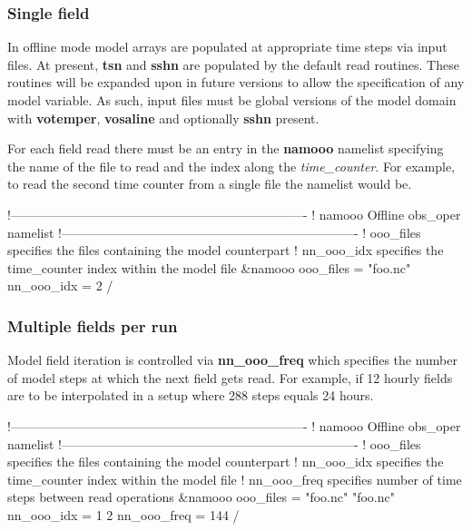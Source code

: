\documentclass[../tex_main/NEMO_manual]{subfiles}
\begin{document}
\subsubsection{Single field}

In offline mode model arrays are populated at appropriate time steps via input files.
At present, \textbf{tsn} and \textbf{sshn} are populated by the default read routines. 
These routines will be expanded upon in future versions to allow the specification of any model variable.
As such, input files must be global versions of the model domain with
\textbf{votemper}, \textbf{vosaline} and optionally \textbf{sshn} present.

For each field read there must be an entry in the \textbf{namooo} namelist specifying
the name of the file to read and the index along the \emph{time\_counter}.
For example, to read the second time counter from a single file the namelist would be.

\begin{forlines}
!----------------------------------------------------------------------
!       namooo Offline obs_oper namelist
!----------------------------------------------------------------------
!   ooo_files    specifies the files containing the model counterpart
!   nn_ooo_idx   specifies the time_counter index within the model file
&namooo
   ooo_files = "foo.nc"
   nn_ooo_idx = 2
/
\end{forlines}

\subsubsection{Multiple fields per run}

Model field iteration is controlled via \textbf{nn\_ooo\_freq} which
specifies the number of model steps at which the next field gets read.
For example, if 12 hourly fields are to be interpolated in a setup where 288 steps equals 24 hours.

\begin{forlines}
!----------------------------------------------------------------------
!       namooo Offline obs_oper namelist
!----------------------------------------------------------------------
!   ooo_files    specifies the files containing the model counterpart
!   nn_ooo_idx   specifies the time_counter index within the model file
!   nn_ooo_freq  specifies number of time steps between read operations
&namooo
   ooo_files = "foo.nc" "foo.nc"
   nn_ooo_idx = 1 2
   nn_ooo_freq = 144
/
\end{forlines}
\end{document}
